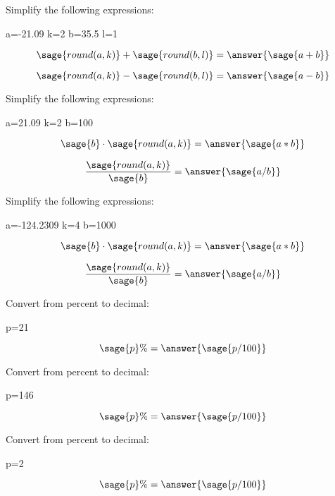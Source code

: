 \documentclass{ximera}
\begin{document}
\begin{problem} Simplify the following expressions:
\begin{sagesilent}
a=-21.09
k=2
b=35.5
l=1
\end{sagesilent}
$$\sage{round(a,k)}+\sage{round(b,l)}=\answer{\sage{a+b}}$$

$$\sage{round(a,k)}-\sage{round(b,l)}=\answer{\sage{a-b}}$$
\end{problem}


\begin{problem} Simplify the following expressions:
\begin{sagesilent}
a=21.09
k=2
b=100
\end{sagesilent}
$$\sage{b}\cdot \sage{round(a,k)}=\answer{\sage{a*b}}$$

$$\frac{\sage{round(a,k)}}{\sage{b}}=\answer{\sage{a/b}}$$
\end{problem}


\begin{problem} Simplify the following expressions:
\begin{sagesilent}
a=-124.2309
k=4
b=1000
\end{sagesilent}
$$\sage{b}\cdot \sage{round(a,k)}=\answer{\sage{a*b}}$$

$$\frac{\sage{round(a,k)}}{\sage{b}}=\answer{\sage{a/b}}$$
\end{problem}

\begin{problem} Convert from percent to decimal:
\begin{sagesilent}
p=21
\end{sagesilent}
$$\sage{p}\%=\answer{\sage{p/100}}$$

\end{problem}



\begin{problem} Convert from percent to decimal:
\begin{sagesilent}
p=146
\end{sagesilent}
$$\sage{p}\%=\answer{\sage{p/100}}$$
\end{problem}


\begin{problem} Convert from percent to decimal:
\begin{sagesilent}
p=2
\end{sagesilent}
$$\sage{p}\%=\answer{\sage{p/100}}$$

\end{problem}
\end{document}
